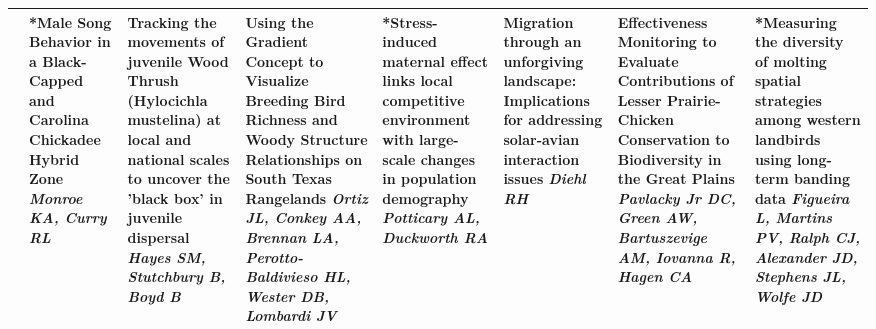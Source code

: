 \begin{tabular}{|x{0.85cm}|a{2.85cm}|x{2.85cm}|x{2.85cm}|x{2.85cm}|a{2.85cm}|a{2.85cm}|a{2.85cm}|}
&*Male Song Behavior in a Black-Capped and Carolina Chickadee Hybrid Zone \newline \newline \textit{Monroe KA, Curry RL} & Tracking the movements of juvenile Wood Thrush (Hylocichla mustelina) at local and national scales to uncover the 'black box' in juvenile dispersal \newline \newline \textit{Hayes SM, Stutchbury B, Boyd B} & Using the Gradient Concept to Visualize Breeding Bird Richness and Woody Structure Relationships on South Texas Rangelands \newline \newline \textit{Ortiz JL, Conkey AA, Brennan LA, Perotto-Baldivieso HL, Wester DB, Lombardi JV} & *Stress-induced maternal effect links local competitive environment with large-scale changes in population demography \newline \newline \textit{Potticary AL, Duckworth RA} & Migration through an unforgiving landscape: Implications for addressing solar-avian interaction issues \newline \newline \textit{Diehl RH} & Effectiveness Monitoring to Evaluate Contributions of Lesser Prairie-Chicken Conservation to Biodiversity in the Great Plains \newline \newline \textit{Pavlacky Jr DC, Green AW, Bartuszevige AM, Iovanna R, Hagen CA} & *Measuring the diversity of molting spatial strategies among western landbirds using long-term banding data \newline \newline \textit{Figueira L, Martins PV, Ralph CJ, Alexander JD, Stephens JL, Wolfe JD}\\
\hline

\end{tabular}

